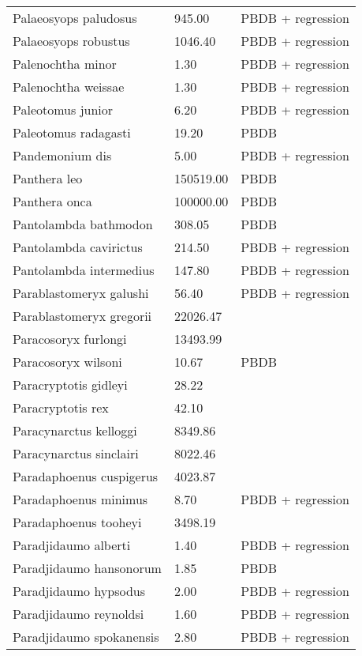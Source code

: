 \begin{longtable}{p{} p{} p{}}
    Palaeosyops paludosus & 945.00 & PBDB + regression \\ 
    Palaeosyops robustus & 1046.40 & PBDB + regression \\ 
    Palenochtha minor & 1.30 & PBDB + regression \\ 
    Palenochtha weissae & 1.30 & PBDB + regression \\ 
    Paleotomus junior & 6.20 & PBDB + regression \\ 
    Paleotomus radagasti & 19.20 & PBDB \\ 
    Pandemonium dis & 5.00 & PBDB + regression \\ 
    Panthera leo & 150519.00 & PBDB \\ 
    Panthera onca & 100000.00 & PBDB \\ 
    Pantolambda bathmodon & 308.05 & PBDB \\ 
    Pantolambda cavirictus & 214.50 & PBDB + regression \\ 
    Pantolambda intermedius & 147.80 & PBDB + regression \\ 
    Parablastomeryx galushi & 56.40 & PBDB + regression \\ 
    Parablastomeryx gregorii & 22026.47 & \cite{Tomiya2013} \\ 
    Paracosoryx furlongi & 13493.99 & \cite{Tomiya2013} \\ 
    Paracosoryx wilsoni & 10.67 & PBDB \\ 
    Paracryptotis gidleyi & 28.22 & \cite{Tomiya2013} \\ 
    Paracryptotis rex & 42.10 & \cite{Tomiya2013} \\ 
    Paracynarctus kelloggi & 8349.86 & \cite{Tomiya2013} \\ 
    Paracynarctus sinclairi & 8022.46 & \cite{Tomiya2013} \\ 
    Paradaphoenus cuspigerus & 4023.87 & \cite{Tomiya2013} \\ 
    Paradaphoenus minimus & 8.70 & PBDB + regression \\ 
    Paradaphoenus tooheyi & 3498.19 & \cite{Tomiya2013} \\ 
    Paradjidaumo alberti & 1.40 & PBDB + regression \\ 
    Paradjidaumo hansonorum & 1.85 & PBDB \\ 
    Paradjidaumo hypsodus & 2.00 & PBDB + regression \\ 
    Paradjidaumo reynoldsi & 1.60 & PBDB + regression \\ 
    Paradjidaumo spokanensis & 2.80 & PBDB + regression \\ 

\end{longtable}
